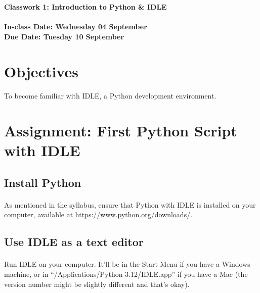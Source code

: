 \documentclass[letter,10pt]{article}
\begin{document}
    \huge
    \textbf{Classwork 1: Introduction to Python \& IDLE}
    \normalsize
    \\ ~~ \\
    \textbf{In-class Date: Wednesday 04 September} \\
    \textbf{Due Date: Tuesday 10 September}
    
    \section*{Objectives}
    \paragraph{}To become familiar with IDLE, a Python development environment.
    
    \section*{Assignment: First Python Script with IDLE}
    \subsection{Install Python}
    \paragraph{}As mentioned in the syllabus, ensure that Python with IDLE is installed on your computer, available at \url{https://www.python.org/downloads/}.
    
    \subsection{Use IDLE as a text editor}
    \paragraph{}Run IDLE on your computer. It'll be in the Start Menu if you have a Windows machine, or in ``/Applications/Python 3.12/IDLE.app'' if you have a Mac (the version number might be slightly different and that's okay).
    
\end{document}
